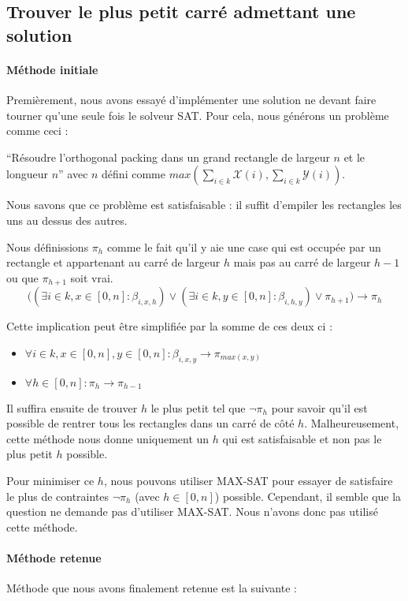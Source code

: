 \documentclass[a4paper]{article}
\begin{document}
\subsection{Trouver le plus petit carré admettant une solution}

\paragraph{Méthode initiale} Premièrement, nous avons essayé d'implémenter une solution ne devant faire tourner qu'une seule fois le solveur SAT.
Pour cela, nous générons un problème comme ceci :

``Résoudre l'orthogonal packing dans un grand rectangle de largeur $n$ et le longueur $n$'' avec $n$ défini comme $max(\sum_{i \in k} \mathcal{X}(i), \sum_{i \in k} \mathcal{Y}(i))$.

Nous savons que ce problème est satisfaisable : il suffit d’empiler les rectangles les uns au dessus des autres.

Nous définissions $\pi_h$ comme le fait qu'il y aie une case qui est occupée par un rectangle et appartenant au carré de largeur $h$ mais pas au carré de largeur $h-1$ ou que $\pi_{h+1}$ soit vrai.
$$
  \Big(
    (\exists i \in k, x \in [0, n]: \beta_{i, x, h})
    \lor (\exists i \in k, y \in [0, n]: \beta_{i, h, y})
    \lor \pi_{h+1}
    \Big)
    \rightarrow \pi_h
$$

Cette implication peut être simplifiée par la somme de ces deux ci :
\begin{itemize}
  \item $\forall i \in k, x \in [0,n], y \in [0,n] :\beta_{i, x, y} \rightarrow \pi_{max(x,y)}$
  \item $\forall h \in [0, n]: \pi_h \rightarrow \pi_{h-1}$
\end{itemize}
\vspace{1em}


Il suffira ensuite de trouver $h$ le plus petit tel que $\lnot \pi_{h}$ pour savoir qu'il est possible de rentrer tous les rectangles dans un carré de côté $h$. Malheureusement, cette méthode nous donne uniquement un $h$ qui est satisfaisable et non pas le plus petit $h$ possible.

Pour minimiser ce $h$, nous pouvons utiliser MAX-SAT pour essayer de satisfaire le plus de contraintes $\lnot \pi_h$ (avec $h \in [0, n]$) possible. Cependant, il semble que la question ne demande pas d'utiliser MAX-SAT. Nous n'avons donc pas utilisé cette méthode.

\paragraph{Méthode retenue} Méthode que nous avons finalement retenue est la suivante :
\end{document}

